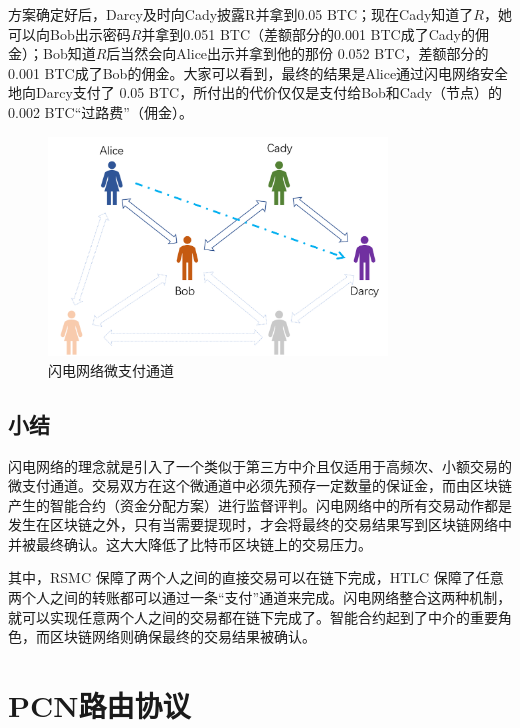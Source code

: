 \documentclass[12pt,a4paper]{article}
\begin{document}
方案确定好后，Darcy及时向Cady披露R并拿到0.05 BTC；现在Cady知道了$R$，她可以向Bob出示密码$R$并拿到0.051 BTC（差额部分的0.001 BTC成了Cady的佣金）；Bob知道$R$后当然会向Alice出示并拿到他的那份 0.052 BTC，差额部分的 0.001 BTC成了Bob的佣金。大家可以看到，最终的结果是Alice通过闪电网络安全地向Darcy支付了 0.05 BTC，所付出的代价仅仅是支付给Bob和Cady（节点）的 0.002 BTC“过路费”（佣金）。

\begin{figure}[htb]
\centering
\includegraphics[width=9cm]{channels}
\caption{闪电网络微支付通道}
\end{figure}

\subsection{小结}
闪电网络的理念就是引入了一个类似于第三方中介且仅适用于高频次、小额交易的微支付通道。交易双方在这个微通道中必须先预存一定数量的保证金，而由区块链产生的智能合约（资金分配方案）进行监督评判。闪电网络中的所有交易动作都是发生在区块链之外，只有当需要提现时，才会将最终的交易结果写到区块链网络中并被最终确认。这大大降低了比特币区块链上的交易压力。

其中，RSMC 保障了两个人之间的直接交易可以在链下完成，HTLC 保障了任意两个人之间的转账都可以通过一条“支付”通道来完成。闪电网络整合这两种机制，就可以实现任意两个人之间的交易都在链下完成了。智能合约起到了中介的重要角色，而区块链网络则确保最终的交易结果被确认。

\section{PCN路由协议}
\end{document}
